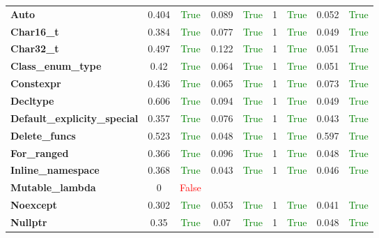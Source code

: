 \documentclass{article}
\begin{document}
\begin{xltabular}{\textwidth}{lcccccccc}
\textbf{{\fontsize{10}{12}\selectfont Auto}}& 0.404&\textcolor{green}{True}& 0.089&\textcolor{green}{True}& 1&\textcolor{green}{True}& 0.052&\textcolor{green}{True} \\[0.5ex]
\textbf{{\fontsize{10}{12}\selectfont Char16\_t}}& 0.384&\textcolor{green}{True}& 0.077&\textcolor{green}{True}& 1&\textcolor{green}{True}& 0.049&\textcolor{green}{True} \\[0.5ex]
\textbf{{\fontsize{10}{12}\selectfont Char32\_t}}& 0.497&\textcolor{green}{True}& 0.122&\textcolor{green}{True}& 1&\textcolor{green}{True}& 0.051&\textcolor{green}{True} \\[0.5ex]
\textbf{{\fontsize{10}{12}\selectfont Class\_enum\_type}}& 0.42&\textcolor{green}{True}& 0.064&\textcolor{green}{True}& 1&\textcolor{green}{True}& 0.051&\textcolor{green}{True} \\[0.5ex]
\textbf{{\fontsize{10}{12}\selectfont Constexpr}}& 0.436&\textcolor{green}{True}& 0.065&\textcolor{green}{True}& 1&\textcolor{green}{True}& 0.073&\textcolor{green}{True} \\[0.5ex]
\textbf{{\fontsize{10}{12}\selectfont Decltype}}& 0.606&\textcolor{green}{True}& 0.094&\textcolor{green}{True}& 1&\textcolor{green}{True}& 0.049&\textcolor{green}{True} \\[0.5ex]
\textbf{{\fontsize{10}{12}\selectfont Default\_explicity\_special}}& 0.357&\textcolor{green}{True}& 0.076&\textcolor{green}{True}& 1&\textcolor{green}{True}& 0.043&\textcolor{green}{True} \\[0.5ex]
\textbf{{\fontsize{10}{12}\selectfont Delete\_funcs}}& 0.523&\textcolor{green}{True}& 0.048&\textcolor{green}{True}& 1&\textcolor{green}{True}& 0.597&\textcolor{green}{True} \\[0.5ex]
\textbf{{\fontsize{10}{12}\selectfont For\_ranged}}& 0.366&\textcolor{green}{True}& 0.096&\textcolor{green}{True}& 1&\textcolor{green}{True}& 0.048&\textcolor{green}{True} \\[0.5ex]
\textbf{{\fontsize{10}{12}\selectfont Inline\_namespace}}& 0.368&\textcolor{green}{True}& 0.043&\textcolor{green}{True}& 1&\textcolor{green}{True}& 0.046&\textcolor{green}{True} \\[0.5ex]
\textbf{{\fontsize{10}{12}\selectfont Mutable\_lambda}}& 0&\textcolor{red}{False} \\[0.5ex]
\textbf{{\fontsize{10}{12}\selectfont Noexcept}}& 0.302&\textcolor{green}{True}& 0.053&\textcolor{green}{True}& 1&\textcolor{green}{True}& 0.041&\textcolor{green}{True} \\[0.5ex]
\textbf{{\fontsize{10}{12}\selectfont Nullptr}}& 0.35&\textcolor{green}{True}& 0.07&\textcolor{green}{True}& 1&\textcolor{green}{True}& 0.048&\textcolor{green}{True} \\[0.5ex]

\end{xltabular}
\end{document}
